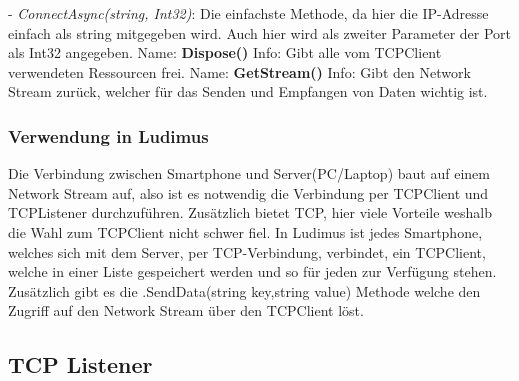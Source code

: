 \newline \tab \newline
- \textit{ConnectAsync(string, Int32)}: Die einfachste Methode, da hier die IP-Adresse einfach als string mitgegeben wird. Auch hier wird als zweiter Parameter der Port als Int32 angegeben.
\newline \newline
Name: \textbf{Dispose()}
\newline
Info: Gibt alle vom TCPClient verwendeten Ressourcen frei.
\newline \newline
Name: \textbf{GetStream()}
\newline
Info: Gibt den Network Stream zurück, welcher für das Senden und Empfangen von Daten wichtig ist.
\newline
\subsubsection{Verwendung in Ludimus}
Die Verbindung zwischen Smartphone und Server(PC/Laptop) baut auf einem Network Stream auf, also ist es notwendig die Verbindung per TCPClient und TCPListener durchzuführen. Zusätzlich bietet TCP, hier viele Vorteile weshalb die Wahl zum TCPClient nicht schwer fiel. In Ludimus ist jedes Smartphone, welches sich mit dem Server, per TCP-Verbindung, verbindet, ein TCPClient, welche in einer Liste gespeichert werden und so für jeden zur Verfügung stehen. Zusätzlich gibt es die .SendData(string key,string value) Methode welche den Zugriff auf den Network Stream über den TCPClient löst.\subsection{TCP Listener} \label{tcplistener}
